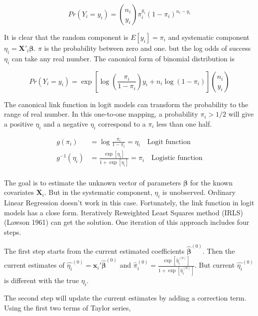 \documentclass[
  11pt,
  openany]{memoir}
\begin{document}
\begin{equation}
Pr(Y_i = y_i) =  {{n_i}\choose{y_i}}  \pi_i^{y_i} (1-\pi_i)^{n_i-y_i}
\end{equation}

It is clear that the random component is \(E[y_i]=\pi_i\) and systematic component \(\eta_i=\mathbf{X}'_i\boldsymbol\beta\).
\(\pi\) is the probability between zero and one. but the log odds of success \(\eta_i\) can take any real number. The canonical form of binomial distribution is

\begin{equation}
Pr(Y_i = y_i) = \exp\left[\log(\frac{\pi_i}{1-\pi_i})y_i+n_i\log(1-\pi_i)\right]{{n_i}\choose{y_i}}
\end{equation}

The canonical link function in logit models can transform the probability to the range of real number. In this one-to-one mapping, a probability \(\pi_i>1/2\) will give a positive \(\eta_i\) and a negative \(\eta_i\) correspond to a \(\pi_i\) less than one half.

\begin{equation}
\begin{split}
g(\pi_i)&=\log\frac{\pi_i}{1-\pi_i}=\eta_i\quad\text{Logit function}\\
g^{-1}(\eta_i)&=\frac{\exp[\eta_i]}{1+\exp[\eta_i]}=\pi_i\quad\text{Logistic function}\\
\end{split}
\label{eq:logit-link}
\end{equation}

The goal is to estimate the unknown vector of parameters \(\boldsymbol\beta\) for the known covariates \(\mathbf{X}_i\).
But in the systematic component, \(\eta_i\) is unobserved. Ordinary Linear Regression doesn't work in this case.
Fortunately, the link function in logit models has a close form.
Iteratively Reweighted Least Squares method (IRLS) (Lawson 1961) can get the solution.
One iteration of this approach includes four steps.

The first step starts from the current estimated coefficients \(\boldsymbol{\hat\beta}^{(0)}\). Then the current estimates of \(\hat{\eta_i}^{(0)}=\mathbf{x}_i'\boldsymbol{\hat\beta}^{(0)}\) and \(\hat \pi_i^{(0)}=\frac{\exp[\hat\eta_i^{(0)}]}{1+\exp[\hat\eta_i^{(0)}]}\).
But current \(\hat{\eta_i}^{(0)}\) is different with the true \(\eta_i\).

The second step will update the current estimates by adding a correction term.
Using the first two terms of Taylor series,
\end{document}
